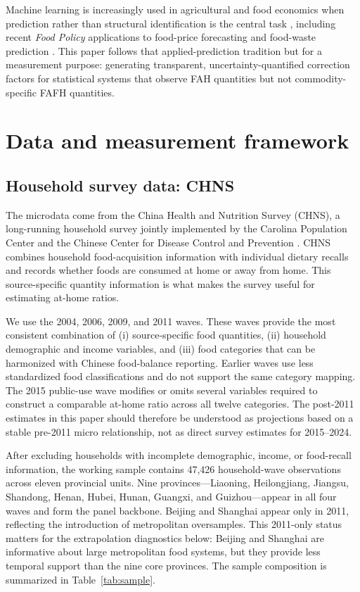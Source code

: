 \documentclass[preprint,12pt,authoryear]{elsarticle}
\begin{document}
Machine learning is increasingly used in agricultural and food economics when prediction rather than structural identification is the central task \citep{MullainathanSpiess2017, AtheyImbens2019, Storm2020, Brignoli2024}, including recent \emph{Food Policy} applications to food-price forecasting and food-waste prediction \citep{Yan2026, MacLachlan2025, Kamran2026}. This paper follows that applied-prediction tradition but for a measurement purpose: generating transparent, uncertainty-quantified correction factors for statistical systems that observe FAH quantities but not commodity-specific FAFH quantities.

\section{Data and measurement framework}
\label{sec:data}

\subsection{Household survey data: CHNS}

The microdata come from the China Health and Nutrition Survey (CHNS), a long-running household survey jointly implemented by the Carolina Population Center and the Chinese Center for Disease Control and Prevention \citep{CHNS_Design, Popkin2010CHNS}. CHNS combines household food-acquisition information with individual dietary recalls and records whether foods are consumed at home or away from home. This source-specific quantity information is what makes the survey useful for estimating at-home ratios.

We use the 2004, 2006, 2009, and 2011 waves. These waves provide the most consistent combination of (i) source-specific food quantities, (ii) household demographic and income variables, and (iii) food categories that can be harmonized with Chinese food-balance reporting. Earlier waves use less standardized food classifications and do not support the same category mapping. The 2015 public-use wave modifies or omits several variables required to construct a comparable at-home ratio across all twelve categories. The post-2011 estimates in this paper should therefore be understood as projections based on a stable pre-2011 micro relationship, not as direct survey estimates for 2015--2024.

After excluding households with incomplete demographic, income, or food-recall information, the working sample contains 47,426 household-wave observations across eleven provincial units. Nine provinces---Liaoning, Heilongjiang, Jiangsu, Shandong, Henan, Hubei, Hunan, Guangxi, and Guizhou---appear in all four waves and form the panel backbone. Beijing and Shanghai appear only in 2011, reflecting the introduction of metropolitan oversamples. This 2011-only status matters for the extrapolation diagnostics below: Beijing and Shanghai are informative about large metropolitan food systems, but they provide less temporal support than the nine core provinces. The sample composition is summarized in Table~\ref{tab:sample}.
\end{document}
